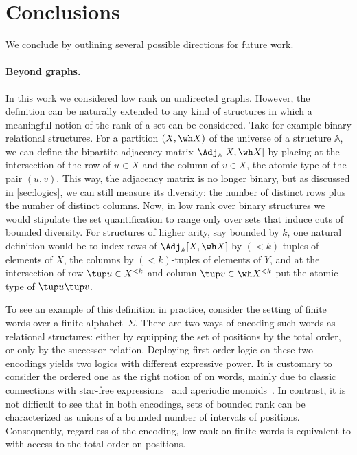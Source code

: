 \section{Conclusions}
\label{sec:conclusions}

We conclude by outlining several possible directions for future work.

\paragraph*{Beyond graphs.} In this work we considered low rank \mso on undirected graphs. However, the definition can be naturally extended to any kind of structures in which a meaningful notion of the rank of a set can be considered. Take for example binary relational structures. For a partition $(X,\wh X)$ of the universe of a structure $\mathbb A$, we can define the bipartite adjacency matrix $\Adj_{\mathbb A}[X,\wh X]$ by placing at the intersection of the row of $u\in X$ and the column of $v\in X$, the atomic type of the pair $(u,v)$. This way, the adjacency matrix is no longer binary, but as discussed in \cref{sec:logics}, we can still measure its diversity: the number of distinct rows plus the number of distinct columns. Now, in low rank \mso over binary structures we would stipulate the set quantification to range only over sets that induce cuts of bounded diversity. For structures of higher arity, say bounded by $k$, one natural definition would be to index rows of $\Adj_{\mathbb A}[X,\wh X]$ by $(<k)$-tuples of elements of $X$, the columns by $(<k)$-tuples of elements of $Y$, and at the intersection of row $\tup u\in X^{<k}$ and column $\tup v\in \wh X^{<k}$ put the atomic type of $\tup u \tup v$.

To see an example of this definition in practice, consider the setting of finite words over a finite alphabet~$\Sigma$. There are two ways of encoding such words as relational structures: either by equipping the set of positions by the total order, or only by the successor relation. Deploying first-order logic \fo on these two encodings yields two logics with different expressive power. It is customary to consider the ordered one as the right notion of \fo on words, mainly due to classic connections with star-free expressions~\cite{McNaughtonPapert71} and aperiodic monoids~\cite{Schutzenberger65}. In contrast, it is not difficult to see that in both encodings, sets of bounded rank can be characterized as unions of a bounded number of intervals of positions. Consequently, regardless of the encoding, low rank \mso on finite words is equivalent to \fo with access to the total order on positions.

